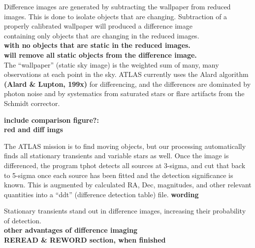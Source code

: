 \documentclass[aps,prb,twocolumn,superscriptaddress]{revtex4-1}
\begin{document}
Difference images are generated by subtracting the wallpaper from reduced 
images. This is done to isolate objects that are changing. Subtraction 
of a properly calibrated wallpaper will produced a difference image \\
containing only objects that are changing in the reduced images.  \\
{\bf with no objects that are static in the reduced images.  }\\
{\bf will remove all static objects from the difference image.  }\\

The ``wallpaper'' (static sky image) is the weighted sum of many, many
observations at each point in the sky.  ATLAS currently uses the
Alard algorithm {\bf (Alard \& Lupton, 199x)} for differencing, and the
differences are dominated by photon noise and by systematics from
saturated stars or flare artifacts from the Schmidt corrector.


{\bf\noindent include comparison figure?:\\ \indent red and diff imgs}


The ATLAS mission is to find moving objects, but our processing
automatically finds all stationary transients and variable stars as
well.  Once the image is differenced, the program tphot detects all
sources at 3-sigma, and cut that back to 5-sigma once each source
has been fitted and the detection significance is known.  
This is augmented by calculated RA, Dec, magnitudes, and other relevant
quantities into a ``ddt'' (difference detection table) file.
{\bf wording}



Stationary transients stand out in difference images, increasing their probability of detection.\\
{\bf other advantages of difference imaging\\}
{\bf REREAD \& REWORD section, when finished\\}
\end{document}
